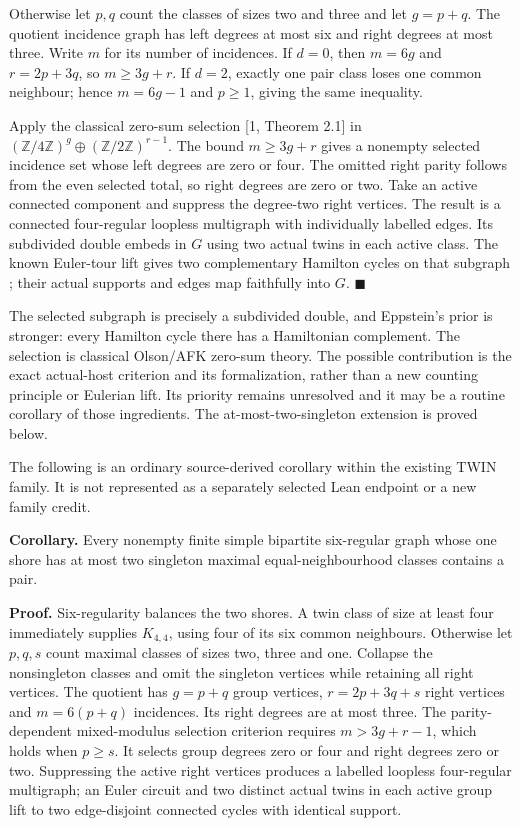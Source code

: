 \documentclass[smallextended]{svjour3}
\newcounter{none} %
\begin{document}
Otherwise let \(p,q\) count the classes of sizes two and three and let
\(g=p+q\). The quotient incidence graph has left degrees at most six and
right degrees at most three. Write \(m\) for its number of incidences.
If \(d=0\), then \(m=6g\) and \(r=2p+3q\), so \(m\geq3g+r\). If \(d=2\),
exactly one pair class loses one common neighbour; hence \(m=6g-1\) and
\(p\geq1\), giving the same inequality.

Apply the classical zero-sum selection {[}1, Theorem 2.1{]} in
\((\mathbb Z/4\mathbb Z)^g\oplus(\mathbb Z/2\mathbb Z)^{r-1}\). The
bound \(m\geq3g+r\) gives a nonempty selected incidence set whose left
degrees are zero or four. The omitted right parity follows from the even
selected total, so right degrees are zero or two. Take an active
connected component and suppress the degree-two right vertices. The
result is a connected four-regular loopless multigraph with individually
labelled edges. Its subdivided double embeds in \(G\) using two actual
twins in each active class. The known Euler-tour lift gives two
complementary Hamilton cycles on that subgraph \cite{ref8}; their actual
supports and edges map faithfully into \(G\). $\blacksquare$

The selected subgraph is precisely a subdivided double, and Eppstein's
prior is stronger: every Hamilton cycle there has a Hamiltonian
complement. The selection is classical Olson/AFK zero-sum theory. The
possible contribution is the exact actual-host criterion and its
formalization, rather than a new counting principle or Eulerian lift.
Its priority remains unresolved and it may be a routine corollary of
those ingredients. The at-most-two-singleton extension is proved below.

The following is an ordinary source-derived corollary within the
existing TWIN family. It is not represented as a separately selected
Lean endpoint or a new family credit.

\textbf{Corollary.} Every nonempty finite simple bipartite six-regular
graph whose one shore has at most two singleton maximal
equal-neighbourhood classes contains a pair.

\textbf{Proof.} Six-regularity balances the two shores. A twin class of
size at least four immediately supplies \(K_{4,4}\), using four of its
six common neighbours. Otherwise let \(p,q,s\) count maximal classes of
sizes two, three and one. Collapse the nonsingleton classes and omit the
singleton vertices while retaining all right vertices. The quotient has
\(g=p+q\) group vertices, \(r=2p+3q+s\) right vertices and \(m=6(p+q)\)
incidences. Its right degrees are at most three. The parity-dependent
mixed-modulus selection criterion requires \(m>3g+r-1\), which holds
when \(p\ge s\). It selects group degrees zero or four and right degrees
zero or two. Suppressing the active right vertices produces a labelled
loopless four-regular multigraph; an Euler circuit and two distinct
actual twins in each active group lift to two edge-disjoint connected
cycles with identical support.
\end{document}
